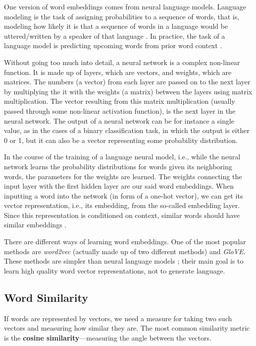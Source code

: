 One version of word embeddings comes from neural language models.
Language modeling is the task of assigning probabilities to a sequence of words, that is, modeling how likely it is that a sequence of words in a language would be uttered/written by a speaker of that language \autocite[181]{koehn2009}. 
In practice, the task of a language model is predicting upcoming words from prior word context \autocite[137]{jurafsky-2019}.

Without going too much into detail, a neural network is a complex non-linear function. 
It is made up of layers, which are vectors, and weights, which are matrices. 
The numbers (a vector) from each layer are passed on to the next layer by multiplying the it with the weights (a matrix) between the layers using matrix multiplication. 
The vector resulting from this matrix multiplication (usually passed through some non-linear activation function), is the next layer in the neural network. 
The output of a neural network can be for instance a single value, as in the cases of a binary classification task, in which the output is either 0 or 1, but it can also be a vector representing some probability distribution.

In the course of the training of a language neural model, i.e., while the neural network learns the probability distributions for words given its neighboring words, the parameters for the weights are learned. 
The weights connecting the input layer with the first hidden layer are our said word embeddings. 
When inputting a word into the network (in form of a one-hot vector), we can get its vector representation, i.e., its embedding, from the so-called embedding layer. 
Since this representation is conditioned on context, similar words should have similar embeddings \autocite[104-105]{koehn-2020}.

There are different ways of learning word embeddings. 
One of the most popular methods are \emph{word2vec} (actually made up of two different methods) and \emph{GloVE}. 
These methods are simpler than neural language models \autocite[111]{jurafsky-2019}; their main goal is to learn high quality word vector representations, not to generate language.

\subsection{Word Similarity}
\label{sec:word-similarity}
If words are represented by vectors, we need a measure for taking two such vectors and measuring how similar they are. 
The most common similarity metric is the \textbf{cosine similarity}---measuring the angle between the vectors. 

